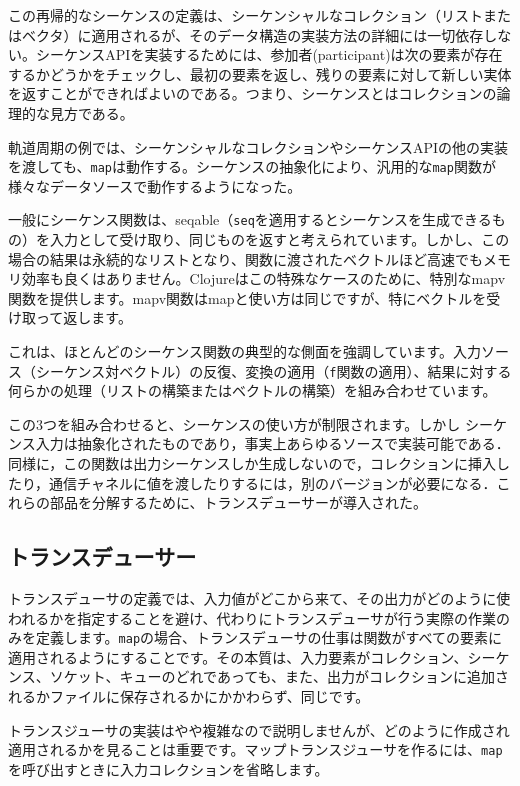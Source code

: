 この再帰的なシーケンスの定義は、シーケンシャルなコレクション（リストまたはベクタ）に適用されるが、そのデータ構造の実装方法の詳細には一切依存しない。シーケンスAPIを実装するためには、参加者(participant)は次の要素が存在するかどうかをチェックし、最初の要素を返し、残りの要素に対して新しい実体を返すことができればよいのである。つまり、シーケンスとはコレクションの論理的な見方である。

軌道周期の例では、シーケンシャルなコレクションやシーケンスAPIの他の実装を渡しても、\texttt{map}は動作する。シーケンスの抽象化により、汎用的な\texttt{map}関数が様々なデータソースで動作するようになった。

一般にシーケンス関数は、seqable（\texttt{seq}を適用するとシーケンスを生成できるもの）を入力として受け取り、同じものを返すと考えられています。しかし、この場合の結果は永続的なリストとなり、関数に渡されたベクトルほど高速でもメモリ効率も良くはありません。Clojureはこの特殊なケースのために、特別なmapv関数を提供します。mapv関数はmapと使い方は同じですが、特にベクトルを受け取って返します。

これは、ほとんどのシーケンス関数の典型的な側面を強調しています。入力ソース（シーケンス対ベクトル）の反復、変換の適用（\texttt{f}関数の適用）、結果に対する何らかの処理（リストの構築またはベクトルの構築）を組み合わせています。

この3つを組み合わせると、シーケンスの使い方が制限されます。しかし シーケンス入力は抽象化されたものであり，事実上あらゆるソースで実装可能である．同様に，この関数は出力シーケンスしか生成しないので，コレクションに挿入したり，通信チャネルに値を渡したりするには，別のバージョンが必要になる．これらの部品を分解するために、トランスデューサーが導入された。

\subsection{トランスデューサー}

トランスデューサの定義では、入力値がどこから来て、その出力がどのように使われるかを指定することを避け、代わりにトランスデューサが行う実際の作業のみを定義します。\texttt{map}の場合、トランスデューサの仕事は関数がすべての要素に適用されるようにすることです。その本質は、入力要素がコレクション、シーケンス、ソケット、キューのどれであっても、また、出力がコレクションに追加されるかファイルに保存されるかにかかわらず、同じです。

トランスジューサの実装はやや複雑なので説明しませんが、どのように作成され適用されるかを見ることは重要です。マップトランスジューサを作るには、\texttt{map}を呼び出すときに入力コレクションを省略します。

